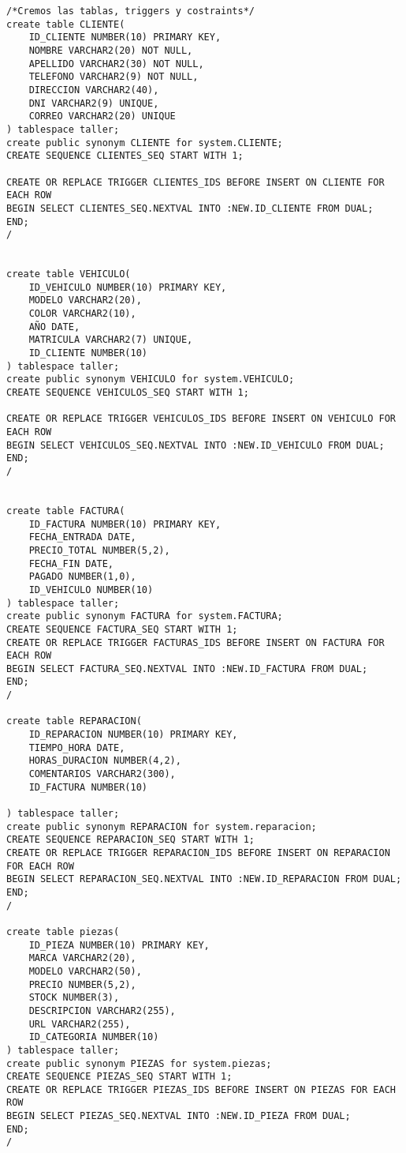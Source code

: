 \begin{lstlisting}[caption=Script .sql para crear la BD (BBDD)]
/*Cremos las tablas, triggers y costraints*/
create table CLIENTE(
    ID_CLIENTE NUMBER(10) PRIMARY KEY,
    NOMBRE VARCHAR2(20) NOT NULL,
    APELLIDO VARCHAR2(30) NOT NULL,
    TELEFONO VARCHAR2(9) NOT NULL,
    DIRECCION VARCHAR2(40),
    DNI VARCHAR2(9) UNIQUE,
    CORREO VARCHAR2(20) UNIQUE
) tablespace taller;
create public synonym CLIENTE for system.CLIENTE;
CREATE SEQUENCE CLIENTES_SEQ START WITH 1;

CREATE OR REPLACE TRIGGER CLIENTES_IDS BEFORE INSERT ON CLIENTE FOR EACH ROW
BEGIN SELECT CLIENTES_SEQ.NEXTVAL INTO :NEW.ID_CLIENTE FROM DUAL;
END;
/


create table VEHICULO(
    ID_VEHICULO NUMBER(10) PRIMARY KEY,
    MODELO VARCHAR2(20),
    COLOR VARCHAR2(10),
    AÑO DATE,
    MATRICULA VARCHAR2(7) UNIQUE,
    ID_CLIENTE NUMBER(10)
) tablespace taller;
create public synonym VEHICULO for system.VEHICULO;
CREATE SEQUENCE VEHICULOS_SEQ START WITH 1;

CREATE OR REPLACE TRIGGER VEHICULOS_IDS BEFORE INSERT ON VEHICULO FOR EACH ROW
BEGIN SELECT VEHICULOS_SEQ.NEXTVAL INTO :NEW.ID_VEHICULO FROM DUAL;
END;
/


create table FACTURA(
    ID_FACTURA NUMBER(10) PRIMARY KEY,
    FECHA_ENTRADA DATE,
    PRECIO_TOTAL NUMBER(5,2),
    FECHA_FIN DATE,
    PAGADO NUMBER(1,0),
    ID_VEHICULO NUMBER(10)
) tablespace taller;
create public synonym FACTURA for system.FACTURA;
CREATE SEQUENCE FACTURA_SEQ START WITH 1;
CREATE OR REPLACE TRIGGER FACTURAS_IDS BEFORE INSERT ON FACTURA FOR EACH ROW
BEGIN SELECT FACTURA_SEQ.NEXTVAL INTO :NEW.ID_FACTURA FROM DUAL;
END;
/

create table REPARACION(
    ID_REPARACION NUMBER(10) PRIMARY KEY,
    TIEMPO_HORA DATE,
    HORAS_DURACION NUMBER(4,2),
    COMENTARIOS VARCHAR2(300),
    ID_FACTURA NUMBER(10)

) tablespace taller;
create public synonym REPARACION for system.reparacion;
CREATE SEQUENCE REPARACION_SEQ START WITH 1;
CREATE OR REPLACE TRIGGER REPARACION_IDS BEFORE INSERT ON REPARACION FOR EACH ROW
BEGIN SELECT REPARACION_SEQ.NEXTVAL INTO :NEW.ID_REPARACION FROM DUAL;
END;
/

create table piezas(
    ID_PIEZA NUMBER(10) PRIMARY KEY,
    MARCA VARCHAR2(20),
    MODELO VARCHAR2(50),
    PRECIO NUMBER(5,2),
    STOCK NUMBER(3),
    DESCRIPCION VARCHAR2(255),
    URL VARCHAR2(255),
    ID_CATEGORIA NUMBER(10)
) tablespace taller;
create public synonym PIEZAS for system.piezas;
CREATE SEQUENCE PIEZAS_SEQ START WITH 1;
CREATE OR REPLACE TRIGGER PIEZAS_IDS BEFORE INSERT ON PIEZAS FOR EACH ROW
BEGIN SELECT PIEZAS_SEQ.NEXTVAL INTO :NEW.ID_PIEZA FROM DUAL;
END;
/


\end{lstlisting}
